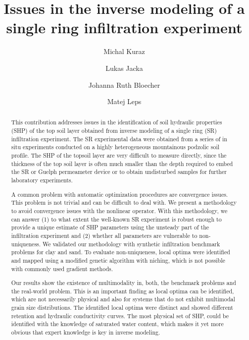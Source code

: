 \documentclass[review,times,3p,twocolumn,10pt]{elsarticle}
\begin{document}
\begin{frontmatter}

\title{Issues in the inverse modeling of a single ring infiltration experiment}

\author[autor1]{Michal Kuraz}

\author[autor1]{Lukas Jacka}

\author[autor1]{Johanna Ruth Bloecher}

\author[autor2]{Matej Leps}



\address[autor1]{Czech University of Life Sciences Prague, Faculty of Environmental Sciences, Department of Water Resources and Environmental Modeling}

\address[autor2]{Czech Technical University in Prague, Faculty of Civil Engineering, Department of Mechanics}

\begin{abstract}
This contribution addresses issues in the identification of soil hydraulic properties (SHP) of the top soil layer obtained from inverse modeling of a single ring (SR) infiltration experiment. 
The SR experimental data were obtained from a series of in situ experiments conducted on a highly heterogeneous mountainous podzolic soil profile. The SHP of the topsoil layer are very difficult to measure directly, since the thickness of the top soil layer is often much smaller than the depth required to embed the SR or Guelph permeameter device or to obtain undisturbed samples for further laboratory experiments.

A common problem with automatic optimization procedures are convergence issues. This problem is not trivial and can be difficult to deal with. We present a methodology to avoid convergence issues with the nonlinear operator. With this methodology, we can answer (1) to what extent the well-known SR experiment is robust enough to provide a unique estimate of SHP parameters using the unsteady part of the infiltration experiment and (2) whether all parameters are vulnerable to non-uniqueness. We validated our methodology with synthetic infiltration benchmark problems for clay and sand. To evaluate non-uniqueness, local optima were identified and mapped using a modified genetic algorithm with niching, which is not possible with commonly used gradient methods. 

Our results show the existence of multimodality in, both, the benchmark problems and the real-world problem. This is an important finding as local optima can be identified, which are not necessarily physical and also for systems that do not exhibit multimodal grain size distributions. The identified local optima were distinct and showed different retention and hydraulic conductivity curves. The most physical set of SHP, could be identified with the knowledge of saturated water content, which makes it yet more obvious that expert knowledge is key in inverse modeling.   



\end{abstract}
\end{frontmatter}
\end{document}
